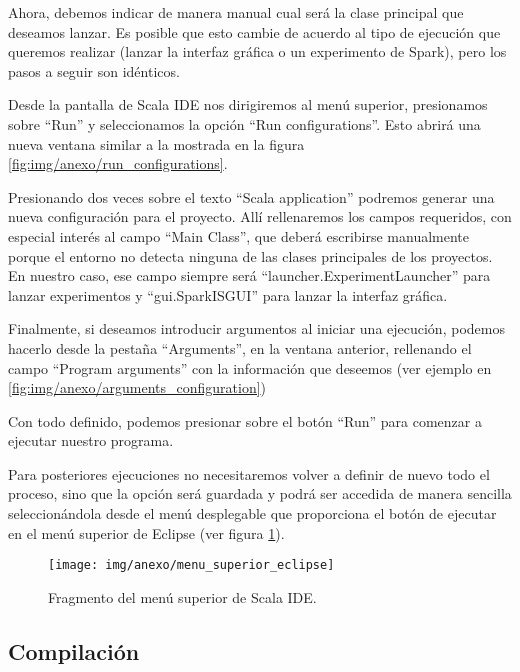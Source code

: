 Ahora, debemos indicar de manera manual cual será la clase principal que deseamos lanzar. Es posible que esto cambie de acuerdo al tipo de ejecución que queremos realizar (lanzar la interfaz gráfica o un experimento de Spark), pero los pasos a seguir son idénticos.

Desde la pantalla de Scala IDE nos dirigiremos al menú superior, presionamos sobre ``Run'' y seleccionamos la opción ``Run configurations''. Esto abrirá una nueva ventana similar a la mostrada en la figura \ref{fig:img/anexo/run_configurations}.

Presionando dos veces sobre el texto ``Scala application'' podremos generar una nueva configuración para el proyecto. Allí rellenaremos los campos requeridos, con especial interés al campo ``Main Class'', que deberá escribirse manualmente porque el entorno no detecta ninguna de las clases principales de los proyectos. En nuestro caso, ese campo siempre será ``launcher.ExperimentLauncher'' para lanzar experimentos y ``gui.SparkISGUI'' para lanzar la interfaz gráfica.




Finalmente, si deseamos introducir argumentos al iniciar una ejecución, podemos hacerlo desde la pestaña ``Arguments'', en la ventana anterior, rellenando el campo ``Program arguments'' con la información que deseemos (ver ejemplo en \ref{fig:img/anexo/arguments_configuration})



Con todo definido, podemos presionar sobre el botón ``Run'' para comenzar a ejecutar nuestro programa.

Para posteriores ejecuciones no necesitaremos volver a definir de nuevo todo el proceso, sino que la opción será guardada y podrá ser accedida de manera sencilla seleccionándola desde el menú desplegable que proporciona el botón de ejecutar en el menú superior de Eclipse (ver figura \ref{fig:img/anexo/menu_superior_eclipse}).

	\begin{figure}[!h]
		\centering
		\texttt{[image: img/anexo/menu\_superior\_eclipse]}
		\caption{Fragmento del menú superior de Scala IDE.}\label{fig:img/anexo/menu_superior_eclipse}
	\end{figure}
	
	
	\subsection{Compilación}\label{subsec:compilacion}

